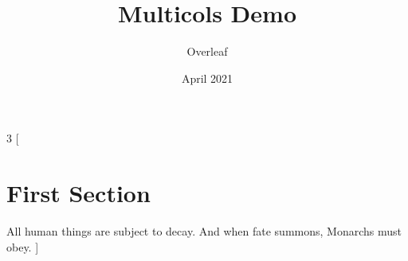 \documentclass{article}
\title{Multicols Demo}
\author{Overleaf}
\date{April 2021}
\begin{document}
\maketitle

\begin{multicols}{3}
[
\section{First Section}
All human things are subject to decay. And when fate summons, Monarchs must obey.
]
\blindtext\blindte
\end{multicols}
\end{document}
